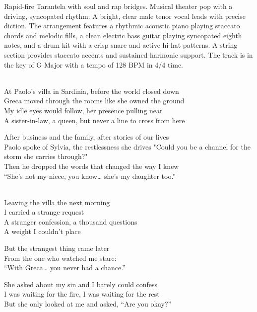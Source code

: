 
\begin{style}
Rapid-fire Tarantela with soul and rap bridges. Musical theater pop with a driving, syncopated rhythm. A bright, clear male tenor vocal leads with precise diction. The arrangement features a rhythmic acoustic piano playing staccato chords and melodic fills, a clean electric bass guitar playing syncopated eighth notes, and a drum kit with a crisp snare and active hi-hat patterns. A string section provides staccato accents and sustained harmonic support. The track is in the key of G Major with a tempo of 128 BPM in 4/4 time.
\end{style}
\begin{lyrics}

\\
At Paolo's villa in Sardinia, before the world closed down\\
Greca moved through the rooms like she owned the ground\\
My idle eyes would follow, her presence pulling near\\
A sister-in-law, a queen, but never a line to cross from here

After business and the family, after stories of our lives\\
Paolo spoke of Sylvia, the restlessness she drives
"Could you be a channel for the storm she carries through?"\\
Then he dropped the words that changed the way I knew
\\
“She’s not my niece, you know… she’s my daughter too.”

\\
Leaving the villa the next morning\\
I carried a strange request\\
A stranger confession, a thousand questions\\
A weight I couldn't place

But the strangest thing came later\\
From the one who watched me stare:
\\
“With Greca… you never had a chance.”

She asked about my sin and I barely could confess\\
I was waiting for the fire, I was waiting for the rest\\
But she only looked at me and asked, “Are you okay?”


\end{lyrics}
